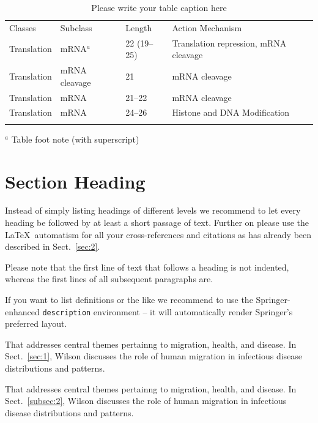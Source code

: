 %
%
\begin{table}
\caption{Please write your table caption here}
\label{tab:1}       %
%
%
\begin{tabular}{p{2cm}p{2.4cm}p{2cm}p{4.9cm}}
\hline\noalign{\smallskip}
Classes & Subclass & Length & Action Mechanism  \\
\noalign{\smallskip}\svhline\noalign{\smallskip}
Translation & mRNA$^a$  & 22 (19--25) & Translation repression, mRNA cleavage\\
Translation & mRNA cleavage & 21 & mRNA cleavage\\
Translation & mRNA  & 21--22 & mRNA cleavage\\
Translation & mRNA  & 24--26 & Histone and DNA Modification\\
\noalign{\smallskip}\hline\noalign{\smallskip}
\end{tabular}
$^a$ Table foot note (with superscript)
\end{table}
%
\section{Section Heading}
\label{sec:3}
Instead of simply listing headings of different levels we recommend to
let every heading be followed by at least a short passage of text.
Further on please use the \LaTeX\ automatism for all your
cross-references and citations as has already been described in
Sect.~\ref{sec:2}.

Please note that the first line of text that follows a heading is not indented, whereas the first lines of all subsequent paragraphs are.

If you want to list definitions or the like we recommend to use the Springer-enhanced \verb|description| environment -- it will automatically render Springer's preferred layout.

\begin{description}[Type 1]
\item[Type 1]{That addresses central themes pertainng to migration, health, and disease. In Sect.~\ref{sec:1}, Wilson discusses the role of human migration in infectious disease distributions and patterns.}
\item[Type 2]{That addresses central themes pertainng to migration, health, and disease. In Sect.~\ref{subsec:2}, Wilson discusses the role of human migration in infectious disease distributions and patterns.}
\end{description}

